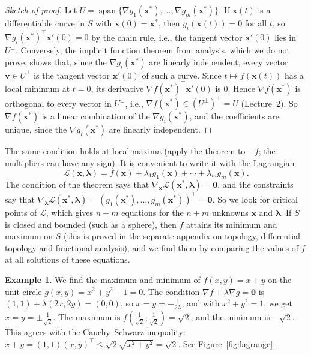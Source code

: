 \documentclass[11pt]{article}
\theoremstyle{definition}
\newtheorem{example}[definition]{Example}
\theoremstyle{plain}
\theoremstyle{remark}
\DeclareMathOperator{\Span}{span}
\begin{document}
\begin{proof}[Sketch of proof]
    Let $U = \Span\{\nabla g_1(\mathbf{x}^*), \ldots, \nabla g_m(\mathbf{x}^*)\}$. If $\mathbf{x}(t)$ is a differentiable curve in $S$ with $\mathbf{x}(0) = \mathbf{x}^*$, then $g_i(\mathbf{x}(t)) = 0$ for all $t$, so $\nabla g_i(\mathbf{x}^*)^\top\mathbf{x}'(0) = 0$ by the chain rule, i.e., the tangent vector $\mathbf{x}'(0)$ lies in $U^\perp$. Conversely, the implicit function theorem from analysis, which we do not prove, shows that, since the $\nabla g_i(\mathbf{x}^*)$ are linearly independent, every vector $\mathbf{v} \in U^\perp$ is the tangent vector $\mathbf{x}'(0)$ of such a curve. Since $t \mapsto f(\mathbf{x}(t))$ has a local minimum at $t = 0$, its derivative $\nabla f(\mathbf{x}^*)^\top\mathbf{x}'(0)$ is $0$. Hence $\nabla f(\mathbf{x}^*)$ is orthogonal to every vector in $U^\perp$, i.e., $\nabla f(\mathbf{x}^*) \in (U^\perp)^\perp = U$ (Lecture~2). So $\nabla f(\mathbf{x}^*)$ is a linear combination of the $\nabla g_i(\mathbf{x}^*)$, and the coefficients are unique, since the $\nabla g_i(\mathbf{x}^*)$ are linearly independent.
\end{proof}

The same condition holds at local maxima (apply the theorem to $-f$; the multipliers can have any sign). It is convenient to write it with the Lagrangian
\[\mathcal{L}(\mathbf{x}, \boldsymbol{\lambda}) = f(\mathbf{x}) + \lambda_1 g_1(\mathbf{x}) + \cdots + \lambda_m g_m(\mathbf{x}).\]
The condition of the theorem says that $\nabla_{\mathbf{x}}\mathcal{L}(\mathbf{x}^*, \boldsymbol{\lambda}) = \mathbf{0}$, and the constraints say that $\nabla_{\boldsymbol{\lambda}}\mathcal{L}(\mathbf{x}^*, \boldsymbol{\lambda}) = (g_1(\mathbf{x}^*), \ldots, g_m(\mathbf{x}^*))^\top = \mathbf{0}$. So we look for critical points of $\mathcal{L}$, which gives $n + m$ equations for the $n + m$ unknowns $\mathbf{x}$ and $\boldsymbol{\lambda}$. If $S$ is closed and bounded (such as a sphere), then $f$ attains its minimum and maximum on $S$ (this is proved in the separate appendix on topology, differential topology and functional analysis), and we find them by comparing the values of $f$ at all solutions of these equations.

\begin{example}\label{ex:lagrange-circle}
    We find the maximum and minimum of $f(x, y) = x + y$ on the unit circle $g(x, y) = x^2 + y^2 - 1 = 0$. The condition $\nabla f + \lambda\nabla g = \mathbf{0}$ is $(1, 1) + \lambda(2x, 2y) = (0, 0)$, so $x = y = -\frac{1}{2\lambda}$, and with $x^2 + y^2 = 1$, we get $x = y = \pm\frac{1}{\sqrt{2}}$. The maximum is $f(\frac{1}{\sqrt{2}}, \frac{1}{\sqrt{2}}) = \sqrt{2}$, and the minimum is $-\sqrt{2}$. This agrees with the Cauchy--Schwarz inequality: $x + y = (1, 1)(x, y)^\top \leq \sqrt{2}\sqrt{x^2 + y^2} = \sqrt{2}$. See Figure~\ref{fig:lagrange}.
\end{example}
\end{document}
